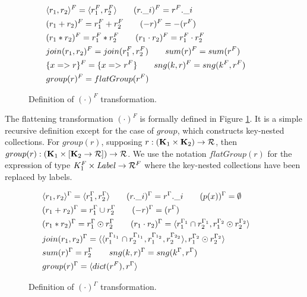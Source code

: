 {{{\begin{figure}
\begin{equation*}
\begin{aligned}
&\langle r_1, r_2 \rangle^F = \langle r_1^F, r_2^F \rangle \qquad (r.\_i)^F = r^F.\_i \\
&(r_1 + r_2)^F = r_1^F + r_2^F \qquad (-r)^F = -(r^F) \\
&(r_1*r_2)^F = r_1^F * r_2^F \qquad (r_1 \cdot r_2)^F = r_1^F \cdot r_2^F  \\
&join(r_1,r_2)^F = join(r_1^F,r_2^F) \qquad sum(r)^F = sum(r^F) \\
&\{x => r\}^F = \{x => r^F \} \qquad sng(k,r)^F = sng(k^F,r^F) \\
&group(r)^F = flatGroup(r^F) \\
\end{aligned}
\qquad
\end{equation*}
\caption{Definition of $(\cdot)^F$ transformation.}
\label{flatdef}
\end{figure}

The flattening transformation $(\cdot)^F$ is formally defined in Figure \ref{flatdef}. It is a simple recursive definition except for the case of $group$, which constructs key-nested collections. For $group(r)$, supposing $r: (\mathbf{K}_1 \times \mathbf{K}_2) \rightarrow \mathcal{R}$, then $group(r): (\mathbf{K}_1 \times [\mathbf{K}_2 \rightarrow \mathcal{R}]) \rightarrow \mathcal{R}$. We use the notation $flatGroup(r)$ for the expression of type $K_1^F\times \textrm{\textit{Label}} \rightarrow \mathcal{R}^F$ where the key-nested collections have been replaced by labels.

\begin{figure}
\begin{equation*}
\begin{aligned}
&\langle r_1, r_2 \rangle^\Gamma = \langle r_1^\Gamma, r_2^\Gamma \rangle \qquad (r.\_i)^\Gamma = r^\Gamma.\_i  \qquad (p(x))^\Gamma = \emptyset \\
&(r_1 + r_2)^\Gamma = r_1^\Gamma \cup r_2^\Gamma \qquad (-r)^\Gamma = (r^\Gamma) \\
&(r_1*r_2)^\Gamma = r_1^\Gamma \odot r_2^\Gamma \qquad (r_1 \cdot r_2)^\Gamma = \langle r_1^{\Gamma_1} \cap r_2^{\Gamma_1}, r_1^{\Gamma_2} \odot r_2^{\Gamma_2} \rangle  \\
&join(r_1,r_2)^\Gamma = \langle \langle r_1^{\Gamma_{1_1}} \cap r_2^{\Gamma_{1_1}}, r_1^{\Gamma_{1_2}},r_2^{\Gamma_{2_2}} \rangle, r_1^{\Gamma_2} \odot r_2^{\Gamma_2} \rangle \\&sum(r)^\Gamma = r^\Gamma_2 \qquad sng(k,r)^\Gamma = sng(k^\Gamma,r^\Gamma) \\
&group(r)^\Gamma = \langle dict(r^F), r^\Gamma \rangle \\
\end{aligned}
\qquad
\end{equation*}
\caption{Definition of $(\cdot)^\Gamma $ transformation.}
\label{contextdef}
\end{figure}

}}}

